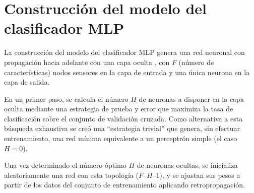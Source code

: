 %
%
%
\section{Construcción del modelo del clasificador MLP}
%
La construcción del modelo del clasificador MLP genera una red
neuronal con propagación hacia adelante con una capa oculta
\cite{nnfaq}, con $F$ (número de características) nodos sensores en la
capa de entrada y una única neurona en la capa de salida.

En un primer paso, se calcula el número $H$ de neuronas a disponer en
la capa oculta mediante una estrategia de prueba y error que maximiza
la tasa de clasificación sobre el conjunto de validación cruzada.
Como alternativa a esta búsqueda exhaustiva se creó una ``estrategia
trivial'' que genera, sin efectuar entrenamiento, una red mínima
equivalente a un perceptrón simple (el caso $H=0$).

Una vez determinado el número óptimo $H$ de neuronas ocultas, se
inicializa aleatoriamente una red con esta topología ($F$--$H$--$1$),
y se ajustan sus pesos a partir de los datos del conjunto de
entrenamiento aplicando retropropagación.
